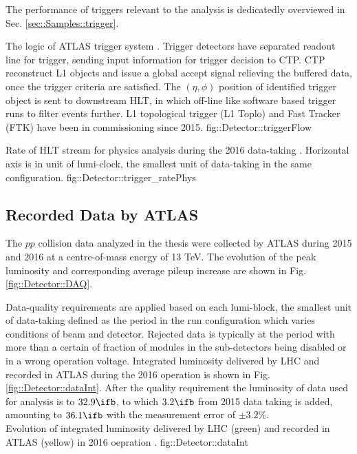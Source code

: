 The performance of triggers relevant to the analysis is dedicatedly overviewed in Sec. \ref{sec::Samples::trigger}.


%
{The logic of ATLAS trigger system \cite{trigger2015}. Trigger detectors have separated readout line for trigger, sending input information for trigger decision to CTP. 
CTP reconstruct L1 objects and issue a global accept signal relieving the buffered data, once the trigger criteria are satisfied. 
The $(\eta,\phi)$ position of identified trigger object is sent to downstream HLT, in which off-line like software based trigger runs to filter events further.
L1 topological trigger (L1 Toplo) and Fast Tracker (FTK) have been in commissioning since 2015. 
}
{fig::Detector::triggerFlow}

{Rate of HLT stream for physics analysis during the 2016 data-taking \cite{trigPubResult}. Horizontal axis is in unit of lumi-clock, the smallest unit of data-taking in the same configuration.}
{fig::Detector::trigger_ratePhys}



\subsection{Recorded Data by ATLAS}
The $pp$ collision data analyzed in the thesis were collected by ATLAS during 2015 and 2016 at a centre-of-mass energy of 13 TeV. 
The evolution of the peak luminosity and  corresponding average pileup increase are shown in Fig. \ref{fig::Detector::DAQ}.

Data-quality requirements are applied based on each lumi-block, the smallest unit of data-taking defined as the period in the run configuration which varies conditions of beam and detector. 
Rejected data is typically at the period with more than a certain of fraction of modules in the sub-detectors being disabled or in a wrong operation voltage.
Integrated luminosity delivered by LHC and recorded in ATLAS during the 2016 operation is shown in Fig. \ref{fig::Detector::dataInt}. After the quality requirement the luminosity of data used for analysis is to $32.9\ifb$, to which $3.2\ifb$ from 2015 data taking is added, amounting to $36.1\ifb$ with the measurement error of $\pm3.2\%$. \\

{Evolution of integrated luminosity delivered by LHC (green) and recorded in ATLAS (yellow) in 2016 oepration \cite{DAQ2016}.}
{fig::Detector::dataInt}

